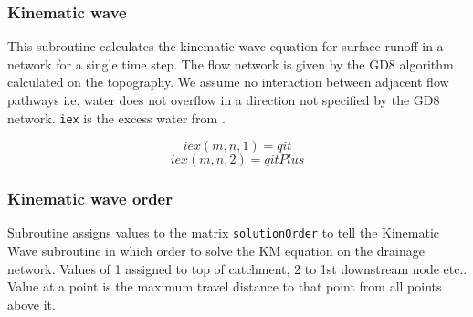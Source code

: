 \subsubsection{Kinematic wave}


This subroutine calculates the kinematic wave equation for surface
runoff in a network for a single time step. The flow network is given
by the GD8 algorithm calculated on the topography. We assume no interaction
between adjacent flow pathways i.e. water does not overflow in a direction
not specified by the GD8 network. \texttt{iex} is the excess water
from . 

\[
iex(m,n,1)=qit
\]
\[
iex(m,n,2)=qitPlus
\]





\subsubsection{Kinematic wave order}


Subroutine assigns values to the matrix \texttt{solutionOrder} to
tell the Kinematic Wave subroutine in which order to solve the KM
equation on the drainage network. Values of 1 assigned to top of catchment,
2 to 1st downstream node etc.. Value at a point is the maximum travel
distance to that point from all points above it.

